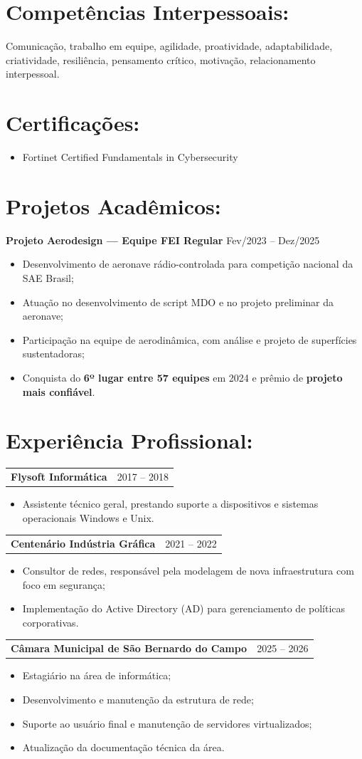 \documentclass[11pt,a4paper]{article}
\makeatletter
\newcommand{\experience}[3]{
	\noindent
  \begin{tabular*}{\textwidth}{@{\extracolsep{\fill}}lr}
    \textbf{#1} & #2 \\
  \end{tabular*}
  \begin{itemize}
    #3
  \end{itemize}
}
\makeatother
\begin{document}
\section*{Competências Interpessoais:}

Comunicação, trabalho em equipe, agilidade, proatividade, adaptabilidade, criatividade, 
resiliência, pensamento crítico, motivação, relacionamento interpessoal.

\section*{Certificações:}
\begin{itemize}
	\item{Fortinet Certified Fundamentals in Cybersecurity}
\end{itemize}

\section*{Projetos Acadêmicos:}

\textbf{Projeto Aerodesign — Equipe FEI Regular} \hfill Fev/2023 -- Dez/2025 

\begin{itemize}
  \item Desenvolvimento de aeronave rádio-controlada para competição nacional da SAE Brasil;
  \item Atuação no desenvolvimento de script MDO e no projeto preliminar da aeronave;
  \item Participação na equipe de aerodinâmica, com análise e projeto de superfícies sustentadoras;
  \item Conquista do \textbf{6º lugar entre 57 equipes} em 2024 e prêmio de \textbf{projeto mais confiável}.
\end{itemize}

\section*{Experiência Profissional:}

\experience{Flysoft Informática}{2017 -- 2018}
{
	\item Assistente técnico geral, prestando suporte a dispositivos e sistemas operacionais Windows e Unix.
}

\experience{Centenário Indústria Gráfica}{2021 -- 2022}
{
	\item Consultor de redes, responsável pela modelagem de nova infraestrutura com foco em segurança;
	\item Implementação do Active Directory (AD) para gerenciamento de políticas corporativas.
}
\experience{Câmara Municipal de São Bernardo do Campo}{2025 -- 2026}
{
	\item Estagiário na área de informática;
	\item Desenvolvimento e manutenção da estrutura de rede;
	\item Suporte ao usuário final e manutenção de servidores virtualizados;
	\item Atualização da documentação técnica da área.
}
\end{document}

